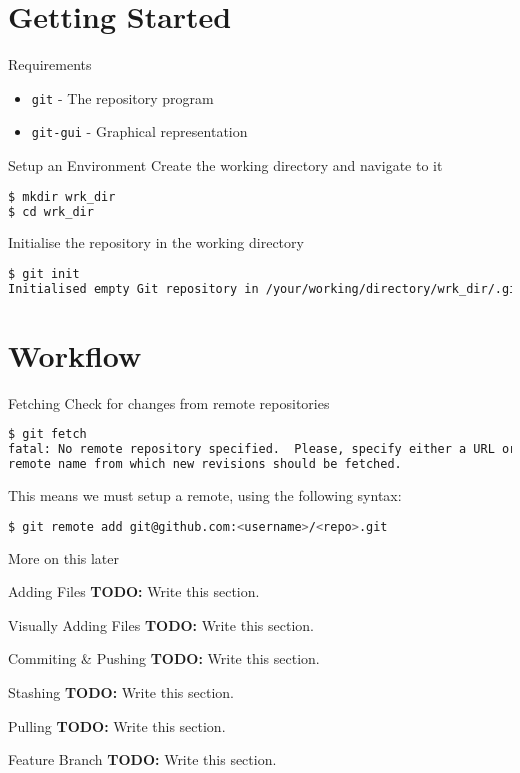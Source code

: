 \documentclass{beamer}
\begin{document}
  \section{Getting Started}
  \begin{frame}{Requirements}
    \begin{itemize}
      \item \texttt{git} - The repository program
      \item \texttt{git-gui} - Graphical representation
    \end{itemize}
  \end{frame}
  \begin{frame}[fragile=singleslide]{Setup an Environment}
    Create the working directory and navigate to it
    \begin{lstlisting}[language=bash]
$ mkdir wrk_dir
$ cd wrk_dir
    \end{lstlisting}
    Initialise the repository in the working directory
    \begin{lstlisting}[language=bash]
$ git init
Initialised empty Git repository in /your/working/directory/wrk_dir/.git/
    \end{lstlisting}
  \end{frame}
  \section{Workflow}
  \begin{frame}[fragile=singleslide]{Fetching}
    Check for changes from remote repositories
    \begin{lstlisting}[language=bash]
$ git fetch
fatal: No remote repository specified.  Please, specify either a URL or a
remote name from which new revisions should be fetched.
    \end{lstlisting}
    This means we must setup a remote, using the following syntax:
    \begin{lstlisting}[language=bash]
$ git remote add git@github.com:<username>/<repo>.git
    \end{lstlisting}
    More on this later
  \end{frame}
  \begin{frame}{Adding Files}
    \textbf{TODO:} Write this section.
  \end{frame}
  \begin{frame}{Visually Adding Files}
    \textbf{TODO:} Write this section.
  \end{frame}
  \begin{frame}{Commiting \& Pushing}
    \textbf{TODO:} Write this section.
  \end{frame}
  \begin{frame}{Stashing}
    \textbf{TODO:} Write this section.
  \end{frame}
  \begin{frame}{Pulling}
    \textbf{TODO:} Write this section.
  \end{frame}
  \begin{frame}{Feature Branch}
    \textbf{TODO:} Write this section.
  \end{frame}
\end{document}
